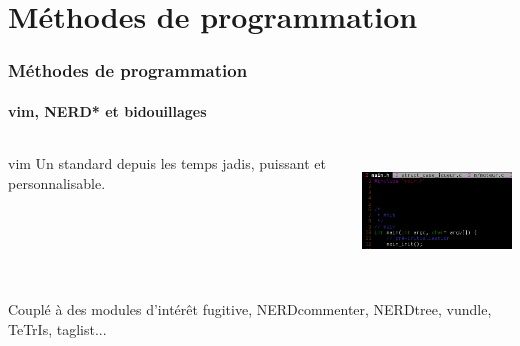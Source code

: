 \documentclass{beamer}
\begin{document}
    \section{Méthodes de programmation}
    \begin{frame}
    \frametitle{Méthodes de programmation}
    \framesubtitle{vim, NERD* et bidouillages}
        \begin{columns}[c] %
            \begin{column}{6cm} %
                \begin{block}{vim}
                    Un standard depuis les temps jadis, puissant et personnalisable.
                \end{block}
            \end{column}
            \begin{column}{5cm} %
                \includegraphics[width=5cm, height=3cm]{ressources/presentation/vim.png}
            \end{column}
        \end{columns}
        \vspace{1cm} %
        \begin{exampleblock}{Couplé à des modules d'intérêt}
            fugitive, NERDcommenter, NERDtree, vundle, TeTrIs, taglist... 
        \end{exampleblock}
    \end{frame}


\end{document}
